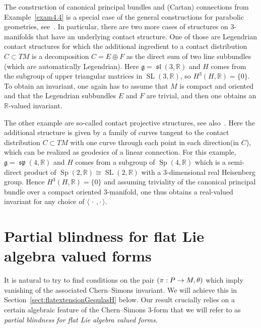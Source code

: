 \documentclass[AHL,Unicode,longabstracts]{cedram}
\newcommand{\B}[2]{\langle#1,#2\rangle}
\DeclareMathOperator{\SL}{SL}
\DeclareMathOperator{\Sp}{Sp}
\DeclareMathOperator{\fksp}{\mathfrak{sp}}
\DeclareMathOperator{\fksl}{\mathfrak{sl}}
\newcommand*{\R}{\mathbb{R}}
\newcommand{\fkg}{\mathfrak{g}}
\renewcommand*{\to}{\mathchoice{\longrightarrow}{\rightarrow}{\rightarrow}{\rightarrow}}
\newcommand*{\R}{\mathbb{R}}
\begin{document}
\begin{exam}\label{exam4.5}
The construction of canonical principal bundles and (Cartan) connections from Example~\ref{exam4.4} is a special case of the general constructions for parabolic geometries, see~\cite{MR2532439}. In particular, there are two more cases of structures on $3$-manifolds that have an underlying contact structure. One of those are Legendrian contact structures for which the additional ingredient to a contact distribution $C\subset TM$ is a decomposition $C=E\oplus F$ as the direct sum of two line subbundles (which are automatically Legendrian). Here $\fkg=\fksl(3,\R)$ and $H$ comes from the subgroup of upper triangular matrices in $\SL(3,\R)$, so $H^3(H,\R)=\{0\}$. To obtain an invariant, one again has to assume that $M$ is compact and oriented and that the Legendrian subbundles $E$ and $F$ are trivial, and then one obtains an $\R$-valued invariant.

The other example are so-called contact projective structures, see also~\cite{MR2189678}. Here the additional structure is given by a family of curves tangent to the contact distribution $C\subset TM$ with one curve through each point in each direction\linebreak(in $C$), which can be realized as geodesics of a linear connection. For this example, $\fkg=\fksp(4,\R)$ and $H$ comes from a subgroup of $\Sp(4,\R)$ which is a semi-direct product of $\Sp(2,\R)\cong \SL(2,\R)$ with a $3$-dimensional real Heisenberg group. Hence $H^3(H,\R)=\{0\}$ and assuming triviality of the canonical principal bundle over a compact oriented $3$-manifold, one thus obtains a real-valued invariant for any choice of $\B{\,\cdot\,}{\cdot\,}$.
\end{exam}%

\section{Partial blindness for flat Lie algebra valued forms}\label{sect:partialblindness}

It is natural to try to find conditions on the pair $(\pi : P \to M,\theta)$ which imply vanishing of the associated Chern--Simons invariant. We will achieve this in Section~\ref{sect:flatextensionGequlasH} below. Our result crucially relies on a certain algebraic feature of the Chern--Simons $3$-form that we will refer to as \emph{partial blindness for flat Lie algebra valued forms}.
\end{document}
